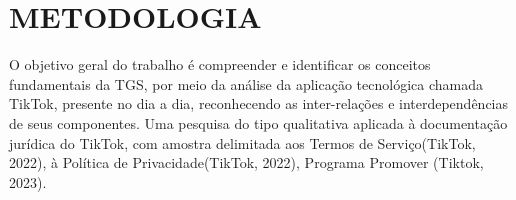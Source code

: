 

\section{METODOLOGIA}

O objetivo geral do trabalho é compreender e identificar os conceitos fundamentais da TGS, por meio da análise da aplicação tecnológica chamada TikTok, presente no dia a dia, reconhecendo as inter-relações e interdependências de seus componentes. Uma pesquisa do tipo qualitativa aplicada à documentação jurídica do TikTok, com amostra delimitada aos Termos de Serviço(TikTok, 2022), à Política de Privacidade(TikTok, 2022), Programa Promover (Tiktok, 2023).

